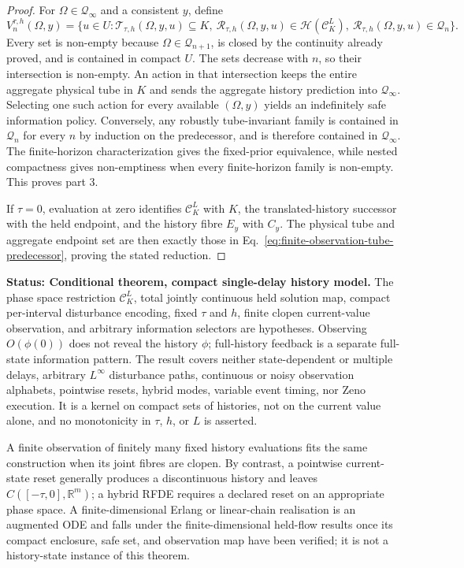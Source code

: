 \documentclass[11pt]{article}
\theoremstyle{definition}
\newcommand{\status}[1]{\par\smallskip\noindent\textbf{Status: #1.}\quad}
\begin{document}
\begin{proof}
For $\Omega\in\mathcal Q_\infty$ and a consistent $y$, define
\[
V_n^{\tau,h}(\Omega,y)=\{u\in U:
\mathscr T_{\tau,h}(\Omega,y,u)\subseteq K,
\ \mathscr R_{\tau,h}(\Omega,y,u)\in\mathcal H(\mathscr C_K^L),
\ \mathscr R_{\tau,h}(\Omega,y,u)\in\mathcal Q_n\}.
\]
Every set is non-empty because $\Omega\in\mathcal Q_{n+1}$, is closed by the
continuity already proved, and is contained in compact $U$.  The sets
decrease with $n$, so their intersection is non-empty.  An action in that
intersection keeps the entire aggregate physical tube in $K$ and sends the
aggregate history prediction into $\mathcal Q_\infty$.  Selecting one such
action for every available $(\Omega,y)$ yields an indefinitely safe
information policy.  Conversely, any robustly tube-invariant family is
contained in $\mathcal Q_n$ for every $n$ by induction on the predecessor,
and is therefore contained in $\mathcal Q_\infty$.  The finite-horizon
characterization gives the fixed-prior equivalence, while nested compactness
gives non-emptiness when every finite-horizon family is non-empty.  This
proves part 3.

If $\tau=0$, evaluation at zero identifies $\mathscr C_K^L$ with $K$, the
translated-history successor with the held endpoint, and the history fibre
$E_y$ with $C_y$.  The physical tube and aggregate endpoint set are then
exactly those in
Eq.~\eqref{eq:finite-observation-tube-predecessor}, proving the stated
reduction.
\end{proof}

\status{Conditional theorem, compact single-delay history model} The phase
space restriction $\mathscr C_K^L$, total jointly continuous held solution
map, compact per-interval disturbance encoding, fixed $\tau$ and $h$, finite
clopen current-value observation, and arbitrary information selectors are
hypotheses.  Observing $O(\phi(0))$ does not reveal the history $\phi$;
full-history feedback is a separate full-state information pattern.  The
result covers neither state-dependent or multiple delays, arbitrary
$L^\infty$ disturbance paths, continuous or noisy observation alphabets,
pointwise resets, hybrid modes, variable event timing, nor Zeno execution.
It is a kernel on compact sets of histories, not on the current value alone,
and no monotonicity in $\tau$, $h$, or $L$ is asserted.

A finite observation of finitely many fixed history evaluations fits the
same construction when its joint fibres are clopen.  By contrast, a
pointwise current-state reset generally produces a discontinuous history
and leaves $C([ -\tau,0],\mathbb R^m)$; a hybrid RFDE requires a declared
reset on an appropriate phase space.  A finite-dimensional Erlang or
linear-chain realisation is an augmented ODE and falls under the
finite-dimensional held-flow results once its compact enclosure, safe set,
and observation map have been verified; it is not a history-state instance
of this theorem.
\end{document}
